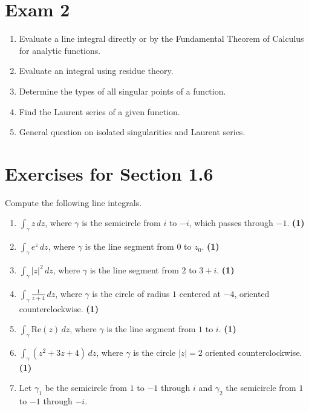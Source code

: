 \documentclass[12pt]{article}
\title{}
\author{}
\date{}
\theoremstyle{definition} %
\theoremstyle{plain} %
\begin{document}
\maketitle

\section*{Exam 2 \quad {}}
\begin{enumerate}
    \item Evaluate a line integral directly or by the Fundamental Theorem of Calculus for analytic functions.
    \item Evaluate an integral using residue theory.
    \item Determine the types of all singular points of a function.
    \item Find the Laurent series of a given function.
    \item General question on isolated singularities and Laurent series.
\end{enumerate}

\section*{Exercises for Section 1.6}

Compute the following line integrals.
\begin{enumerate}
    \item $\displaystyle \int_\gamma z \, dz$, where $\gamma$ is the semicircle from $i$ to $-i$, which passes through $-1$. \quad \textbf{(1)}
    \item $\displaystyle \int_\gamma e^z \, dz$, where $\gamma$ is the line segment from $0$ to $z_0$. \quad \textbf{(1)}
    \item $\displaystyle \int_\gamma |z|^2 \, dz$, where $\gamma$ is the line segment from $2$ to $3 + i$. \quad \textbf{(1)}
    \item $\displaystyle \int_\gamma \frac{1}{z + 4} \, dz$, where $\gamma$ is the circle of radius $1$ centered at $-4$, oriented counterclockwise. \quad \textbf{(1)}
    \item $\displaystyle \int_\gamma \text{Re}(z) \, dz$, where $\gamma$ is the line segment from $1$ to $i$. \quad \textbf{(1)}
    \item $\displaystyle \int_\gamma (z^2 + 3z + 4) \, dz$, where $\gamma$ is the circle $|z| = 2$ oriented counterclockwise. \quad \textbf{(1)}
    \item Let $\gamma_1$ be the semicircle from $1$ to $-1$ through $i$ and $\gamma_2$ the semicircle from $1$ to $-1$ through $-i$. 
\end{enumerate}
\end{document}
